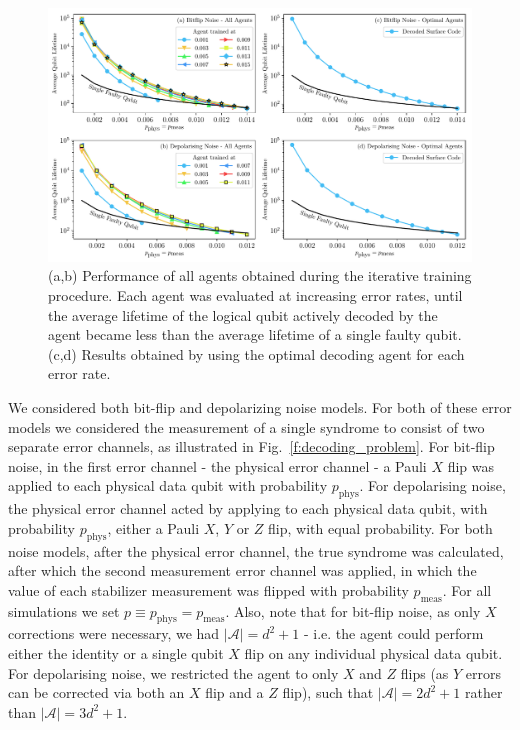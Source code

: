 \documentclass[twocolumn,preprintnumbers,amsmath,amssymb,notitlepage,nofootinbib,longbibliography,superscriptaddress,aps,pra,10pt]{revtex4-1}
\begin{document}
	\begin{figure}
		\centering
		\includegraphics[width=\linewidth]{figures/final_results.pdf}
		\caption{
			(a,b) Performance of all agents obtained during the iterative training procedure.
			Each agent was evaluated at increasing error rates, until the average lifetime of the logical qubit actively decoded by the agent became less than the average lifetime of a single faulty qubit.
			(c,d) Results obtained by using the optimal decoding agent for each error rate.
		}
		\label{f:results}
	\end{figure}

	We considered both bit-flip and depolarizing noise models.
	For both of these error models we considered the measurement of a single syndrome to consist of two separate error channels, as illustrated in Fig.~\ref{f:decoding_problem}.
	For bit-flip noise, in the first error channel - the physical error channel - a Pauli $X$ flip was applied to each physical data qubit with probability $p_{\mathrm{phys}}$.
	For depolarising noise, the physical error channel acted by applying to each physical data qubit, with probability $p_{\mathrm{phys}}$, either a Pauli $X$, $Y$ or $Z$ flip, with equal probability.
	For both noise models, after the physical error channel, the true syndrome was calculated, after which the second measurement error channel was applied, in which the value of each stabilizer measurement was flipped with probability $p_{\mathrm{meas}}$.
	For all simulations we set $p \equiv p_{\mathrm{phys}} = p_{\mathrm{meas}}$.
	Also, note that for bit-flip noise, as only $X$ corrections were necessary, we had $|\mathcal{A}| = d^2 + 1$ - i.e. the agent could perform either the identity or a single qubit $X$ flip on any individual physical data qubit.
	For depolarising noise, we restricted the agent to only $X$ and $Z$ flips (as $Y$ errors can be corrected via both an $X$ flip and a $Z$ flip), such that $|\mathcal{A}| = 2d^2 + 1$ rather than $|\mathcal{A}| = 3d^2 + 1$.
\end{document}

